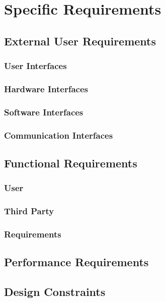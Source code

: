 \documentclass[12pt]{report}
\begin{document}
\newpage
\chapter{Specific Requirements}
    \section{External User Requirements}
        \subsection{User Interfaces}
        	
       	\newpage
        \subsection{Hardware Interfaces}
        	
        \subsection{Software Interfaces}
        	
        \subsection{Communication Interfaces}
    \section{Functional Requirements}
        \subsection{User}
            
        \newpage
        \subsection{Third Party}
            
        \subsection{Requirements}
        	
    \section{Performance Requirements}
    	
    \section{Design Constraints}
\end{document}
